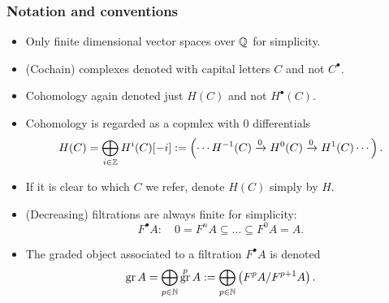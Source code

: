 \documentclass[notheorems]{beamer}
\theoremstyle{plain}
\theoremstyle{definition}
\theoremstyle{darkredexample}
\theoremstyle{remark}
\DeclareMathOperator{\gr}{gr}
\begin{document}
\begin{frame}
    \frametitle{Notation and conventions \cite{stacks}}
	\begin{itemize}
	    \item Only finite dimensional vector spaces over $\mathbb{Q}$ for simplicity.
		\pause
	    \item (Cochain) complexes denoted with capital letters $C$ and not $C^{\bullet}$.
		\pause
	    \item Cohomology again denoted just $H(C)$ and not $H^{\bullet}(C)$.
		\pause
	    \item Cohomology is regarded as a copmlex with $0$ differentials
		\[ H(C)=\bigoplus_{i\in \mathbb{Z}}H^{i}(C)[-i]:=\left(\cdots H^{-1}(C)\xrightarrow{0} H^{0}(C)\xrightarrow{0}H^{1}(C) \cdots \right). \]
		\pause
	    \item If it is clear to which $C$ we refer, denote $H(C)$ simply by $H$.
		\pause
	    \item (Decreasing) filtrations are always finite for simplicity:
		\[ F^{\bullet}A \colon \quad 0=F^{n}A\subseteq \ldots \subseteq F^{0}A=A. \]
		\pause
	    \item The graded object associated to a filtration $F^{\bullet}A$ is denoted
		\[ \gr{A}=\bigoplus_{p\in \N} \gr^{p}A:=\bigoplus_{p\in \N}\left( F^{p}A/F^{p+1}A \right). \]
	\end{itemize}
\end{frame}
\end{document}
